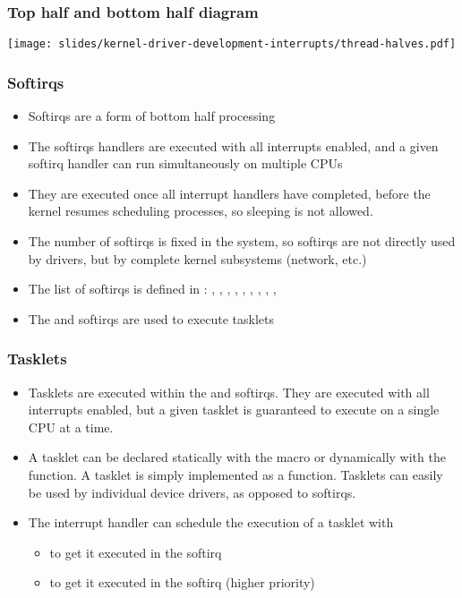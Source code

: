 \begin{frame}
  \frametitle{Top half and bottom half diagram}
  \begin{center}
    \texttt{[image: slides/kernel-driver-development-interrupts/thread-halves.pdf]}
  \end{center}
\end{frame}

\begin{frame}
  \frametitle{Softirqs}
  \begin{itemize}
  \item Softirqs are a form of bottom half processing
  \item The softirqs handlers are executed with all interrupts
    enabled, and a given softirq handler can run simultaneously on
    multiple CPUs
  \item They are executed once all interrupt handlers have completed,
    before the kernel resumes scheduling processes, so sleeping is not
    allowed.
  \item The number of softirqs is fixed in the system, so softirqs are
    not directly used by drivers, but by complete kernel subsystems
    (network, etc.)
  \item The list of softirqs is defined in
    : , ,
    , , , ,
    , , , 
  \item The  and  softirqs are used to execute
    tasklets
  \end{itemize}
\end{frame}

\begin{frame}
  \frametitle{Tasklets}
  \begin{itemize}
  \item Tasklets are executed within the  and 
    softirqs. They are executed with all interrupts enabled, but a
    given tasklet is guaranteed to execute on a single CPU at a time.
  \item A tasklet can be declared statically with the
     macro or dynamically with the
     function. A tasklet is simply implemented as
    a function. Tasklets can easily be used by individual device
    drivers, as opposed to softirqs.
  \item The interrupt handler can schedule the execution of a tasklet
    with
    \begin{itemize}
    \item {} to get it executed in the
       softirq
    \item {} to get it executed in the
       softirq (higher priority)
    \end{itemize}
  \end{itemize}
\end{frame}

